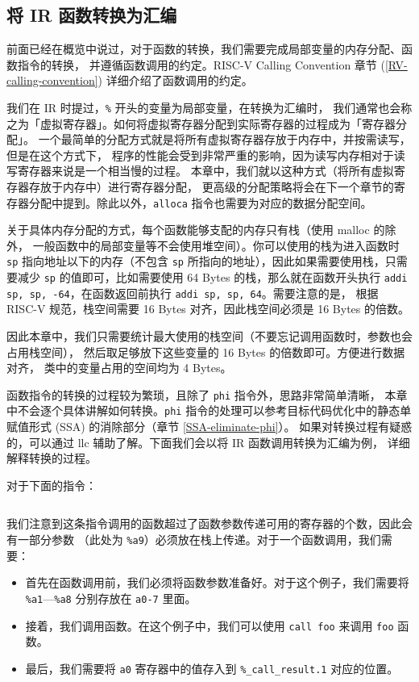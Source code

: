 \subsection{将 IR 函数转换为汇编}\label{IR-func-to-asm}

前面已经在概览中说过，对于函数的转换，我们需要完成局部变量的内存分配、函数指令的转换，
并遵循函数调用的约定。RISC-V Calling Convention 章节
(\ref{RV-calling-convention}) 详细介绍了函数调用的约定。

我们在 IR 时提过，\texttt{\%} 开头的变量为局部变量，在转换为汇编时，
我们通常也会称之为「虚拟寄存器」。如何将虚拟寄存器分配到实际寄存器的过程成为「寄存器分配」。
一个最简单的分配方式就是将所有虚拟寄存器存放于内存中，并按需读写，但是在这个方式下，
程序的性能会受到非常严重的影响，因为读写内存相对于读写寄存器来说是一个相当慢的过程。
本章中，我们就以这种方式（将所有虚拟寄存器存放于内存中）进行寄存器分配，
更高级的分配策略将会在下一个章节的寄存器分配中提到。除此以外，\texttt{alloca}
指令也需要为对应的数据分配空间。

关于具体内存分配的方式，每个函数能够支配的内存只有栈（使用 malloc 的除外，
一般函数中的局部变量等不会使用堆空间）。你可以使用的栈为进入函数时 \texttt{sp}
指向地址以下的内存（不包含 \texttt{sp} 所指向的地址），因此如果需要使用栈，只需要减少
\texttt{sp} 的值即可，比如需要使用 64 Bytes 的栈，那么就在函数开头执行
\texttt{addi sp, sp, -64}，在函数返回前执行 \texttt{addi sp, sp, 64}。需要注意的是，
根据 RISC-V 规范，栈空间需要 16 Bytes 对齐，因此栈空间必须是 16 Bytes 的倍数。

因此本章中，我们只需要统计最大使用的栈空间（不要忘记调用函数时，参数也会占用栈空间），
然后取足够放下这些变量的 16 Bytes 的倍数即可。方便进行数据对齐，
类中的变量占用的空间均为 4 Bytes。

函数指令的转换的过程较为繁琐，且除了 \texttt{phi} 指令外，思路非常简单清晰，
本章中不会逐个具体讲解如何转换。\texttt{phi} 指令的处理可以参考目标代码优化中的静态单赋值形式
(SSA) 的消除部分（章节 \ref{SSA-eliminate-phi}）。
如果对转换过程有疑惑的，可以通过 llc 辅助了解。下面我们会以将 IR 函数调用转换为汇编为例，
详细解释转换的过程。

对于下面的指令：
\begin{lstlisting}[language=LLVM]
  %_call_result.1 = call i32 @foo(i32 %a1, i32 %a2, i32 %a3, i32 %a4, i32 %a5, i32 %a6, i32 %a7, i32 %a8, i32 %a9)
\end{lstlisting}

我们注意到这条指令调用的函数超过了函数参数传递可用的寄存器的个数，因此会有一部分参数
（此处为 \texttt{\%a9}）必须放在栈上传递。对于一个函数调用，我们需要：
\begin{itemize}
  \item 首先在函数调用前，我们必须将函数参数准备好。对于这个例子，我们需要将
    \texttt{\%a1}—\texttt{\%a8} 分别存放在 \texttt{a0-7} 里面。
  \item 接着，我们调用函数。在这个例子中，我们可以使用 \texttt{call foo} 来调用
    \texttt{foo} 函数。
  \item 最后，我们需要将 \texttt{a0} 寄存器中的值存入到 \texttt{\%\_call\_result.1}
    对应的位置。
\end{itemize}

